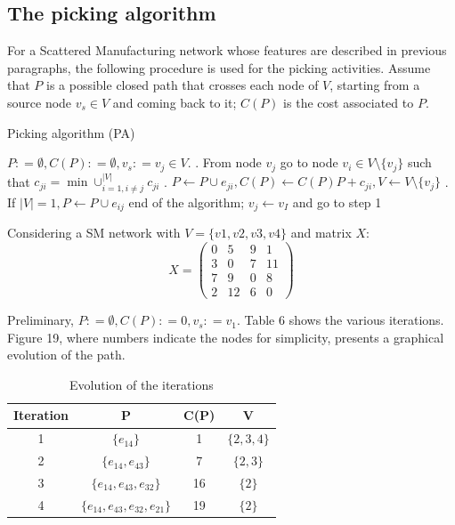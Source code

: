 \subsection{The picking algorithm}
For a Scattered Manufacturing network whose features are described in previous paragraphs, the following procedure is used for the picking activities. Assume that $P$ is a possible closed path that crosses each node of $V$, starting from a source node $ v_s \in V$ and coming back to it; $C(P)$ is the cost associated to $P$.
\begin{algorithm}
    \caption{Picking algorithm (PA)}
    \label{listing7}
    \begin{algorithmic}[1]
        \State $P : = \emptyset, C(P) : = \emptyset, v_s : = v_j \in V$.
        \EndProcedure
        . From node $v_j$ go to node $v_i \in V\setminus\{v_j\}$ such that $c_{ji} = \min\cup^{|V|}_{i=1,i\neq j} c_{ji}$
        . $P \leftarrow P \cup e_{ji}, C(P) \leftarrow C(P)P + c_{ji}, V \leftarrow V\setminus \{v_j\}$ 
        . \If If $|V| = 1, P \leftarrow P\cup e_{ij}$ \Return end of the algorithm; \Else  $v_j \leftarrow v_I$ and go to step 1 \EndIf
        \EndProcedure
    \end{algorithmic} 
\end{algorithm}

Considering a SM network with $V = \{v1, v2, v3, v4\}$ and matrix $X$:
\begin{equation}
    \label{eq:x-matrix-sample-initialization}
    X = \begin{pmatrix} 0 & 5 & 9 & 1\\ 3 & 0 & 7 & 11\\ 7 & 9 & 0 & 8\\ 2 & 12 & 6 & 0 \end{pmatrix}
\end{equation}

Preliminary, $P : = \emptyset , C(P) : = 0, v_s : = v_1$. Table 6 shows the various iterations. Figure 19, where numbers indicate the nodes for simplicity, presents a graphical evolution of the path.
\begin{table}
    \centering
    \begin{tabular}{|c|c|c|c|}
        \hline
        \textbf{Iteration} & \textbf{P} & \textbf{C(P)} & \textbf{V} \\
        \hline
        1 & $\{e_{14}\}$ & 1 & $\{2,3,4\}$\\
        \hline
        2 & $\{e_{14}, e_{43}\}$ & 7 & $\{2,3\}$\\
        \hline
        3 & $\{e_{14}, e_{43}, e_{32}\}$ & 16 & $\{2\}$\\
        \hline
        4 & $\{e_{14}, e_{43}, e_{32}, e_{21}\}$ & 19 & $\{2\}$\\
        \hline
    \end{tabular}

    \caption{Evolution of the iterations}
    \label{tab:evolution-of-iterations}
\end{table}


